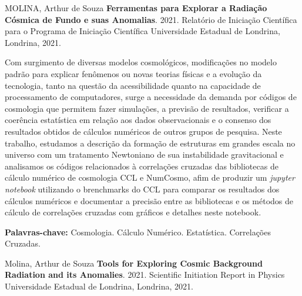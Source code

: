 \documentclass[12pt,a4paper,oneside,brazil]{abntex2}
\theoremstyle{definition}
\numberwithin{defin}{section}
\numberwithin{thm}{section}
\numberwithin{notation}{section}
\theoremstyle{remark}
\numberwithin{exmp}{section}
\numberwithin{p}{section}
\numberwithin{lema}{section}
\begin{document}
	\begin{SingleSpace}
		\noindent MOLINA, Arthur de Souza \textbf{Ferramentas para Explorar a Radiação Cósmica de Fundo e suas Anomalias}.
		2021. Relatório de Iniciação Científica para o Programa de Iniciação Científica \textendash{}
		Universidade Estadual de Londrina, Londrina, 2021.
	\end{SingleSpace}
	
	\setlength{\absparsep}{18pt}
	
	\begin{resumo}
		
		Com surgimento de diversas modelos cosmológicos, modificações no modelo padrão para explicar fenômenos ou novas teorias físicas e a evolução da tecnologia, tanto na questão da acessibilidade quanto na capacidade de processamento de computadores, surge a necessidade da demanda por códigos de cosmologia que permitem fazer simulações, a previsão de resultados, verificar a coerência estatística em relação aos dados observacionais e o consenso dos resultados obtidos de cálculos numéricos de outros grupos de pesquisa. Neste trabalho, estudamos a descrição da formação de estruturas em grandes escala no universo com um tratamento Newtoniano de sua instabilidade gravitacional e analisamos os códigos relacionados à correlações cruzadas das bibliotecas de cálculo numérico de cosmologia CCL e NumCosmo, afim de produzir um \textit{jupyter notebook} utilizando o brenchmarks do CCL para comparar os resultados dos cálculos numéricos e documentar a precisão entre as bibliotecas e os métodos de cálculo de correlações cruzadas com gráficos e detalhes neste notebook.
		
		\textbf{Palavras-chave:} Cosmologia. Cálculo Numérico.
		 Estatística. Correlações Cruzadas.
	\end{resumo}
	

	
	\begin{SingleSpace}
		\noindent Molina, Arthur de Souza \textbf{Tools for Exploring Cosmic Background Radiation and its Anomalies}. 2021.
		Scientific Initiation Report in Physics \textendash{} Universidade
		Estadual de Londrina, Londrina, 2021.
	\end{SingleSpace}
	
	\setlength{\absparsep}{18pt}
	
\end{document}
